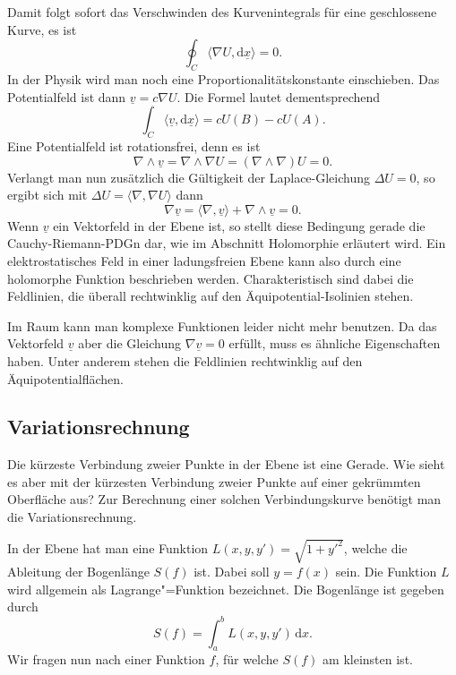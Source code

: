 \documentclass[a4paper,11pt,fleqn,twocolumn,twoside]{scrartcl}
\numberwithin{equation}{section}
\begin{document}
Damit folgt sofort das Verschwinden des Kurvenintegrals für eine
geschlossene Kurve, es ist
\begin{equation}
\oint_C \langle\nabla U,\mathrm d\underline x\rangle = 0.
\end{equation}
In der Physik wird man noch eine Proportionalitätskonstante einschieben.
Das Potentialfeld ist dann $\underline v=c\nabla U$.
Die Formel lautet dementsprechend
\begin{equation}
\int_C \langle\underline v,\mathrm d\underline x\rangle
= cU(B)-cU(A).
\end{equation}
Eine Potentialfeld ist rotationsfrei, denn es ist
\begin{equation}
\nabla\wedge\underline v = \nabla\wedge \nabla U
= (\nabla\wedge\nabla)U = 0.
\end{equation}
Verlangt man nun zusätzlich die Gültigkeit der Laplace-Gleichung
$\Delta U = 0$, so ergibt sich mit
$\Delta U = \langle\nabla,\nabla U\rangle$ dann
\begin{equation}
\nabla\underline v
= \langle\nabla,\underline v\rangle + \nabla\wedge\underline v=0.
\end{equation}
Wenn $\underline v$ ein Vektorfeld in der Ebene ist, so
stellt diese Bedingung gerade die Cauchy-Riemann-PDGn dar, wie
im Abschnitt Holomorphie erläutert wird. Ein elektrostatisches
Feld in einer ladungsfreien Ebene kann also durch eine holomorphe
Funktion beschrieben werden. Charakteristisch sind dabei die
Feldlinien, die überall rechtwinklig auf den Äquipotential-Isolinien
stehen.

Im Raum kann man komplexe Funktionen leider nicht mehr benutzen.
Da das Vektorfeld $\underline v$ aber die Gleichung
$\nabla\underline v=0$ erfüllt, muss es ähnliche Eigenschaften
haben. Unter anderem stehen die Feldlinien rechtwinklig auf den
Äquipotentialflächen.


\subsection{Variationsrechnung}

Die kürzeste Verbindung zweier Punkte in der Ebene ist eine Gerade.
Wie sieht es aber mit der kürzesten Verbindung zweier Punkte auf
einer gekrümmten Oberfläche aus? Zur Berechnung einer solchen
Verbindungskurve benötigt man die Variationsrechnung.

In der Ebene hat man eine Funktion $L(x,y,y') = \sqrt{1+y'^2}$,
welche die Ableitung der Bogenlänge $S(f)$ ist. Dabei soll
$y=f(x)$ sein. Die Funktion $L$ wird allgemein als
Lagrange"=Funktion bezeichnet. Die Bogenlänge ist gegeben durch
\begin{equation}
S(f) = \int_a^b L(x,y,y')\,\mathrm dx.
\end{equation}
Wir fragen nun nach einer Funktion $f$, für welche $S(f)$ am
kleinsten ist.
\end{document}
